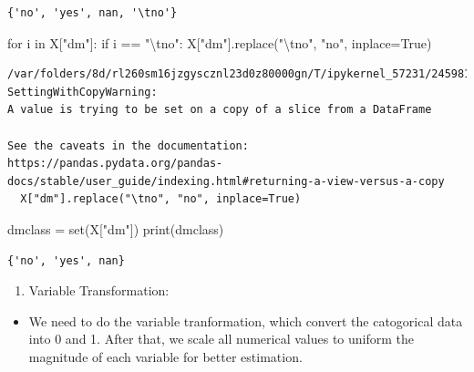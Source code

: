 \documentclass[
  11pt,
  letterpaper,
  DIV=11,
  numbers=noendperiod]{scrartcl}
\newenvironment{Shaded}{\begin{snugshade}}{\end{snugshade}}
\newcommand{\BuiltInTok}[1]{\textcolor[rgb]{0.00,0.23,0.31}{#1}}
\newcommand{\CharTok}[1]{\textcolor[rgb]{0.13,0.47,0.30}{#1}}
\newcommand{\ControlFlowTok}[1]{\textcolor[rgb]{0.00,0.23,0.31}{#1}}
\newcommand{\KeywordTok}[1]{\textcolor[rgb]{0.00,0.23,0.31}{#1}}
\newcommand{\NormalTok}[1]{\textcolor[rgb]{0.00,0.23,0.31}{#1}}
\newcommand{\OperatorTok}[1]{\textcolor[rgb]{0.37,0.37,0.37}{#1}}
\newcommand{\StringTok}[1]{\textcolor[rgb]{0.13,0.47,0.30}{#1}}
\newcommand{\VariableTok}[1]{\textcolor[rgb]{0.07,0.07,0.07}{#1}}
\providecommand{\tightlist}{%
  \setlength{\itemsep}{0pt}\setlength{\parskip}{0pt}}\usepackage{longtable,booktabs,array}
\begin{document}
\begin{verbatim}
{'no', 'yes', nan, '\tno'}
\end{verbatim}

\begin{Shaded}
\begin{Highlighting}[]
\ControlFlowTok{for}\NormalTok{ i }\KeywordTok{in}\NormalTok{ X[}\StringTok{"dm"}\NormalTok{]:}
    \ControlFlowTok{if}\NormalTok{ i }\OperatorTok{==} \StringTok{"}\CharTok{\textbackslash{}t}\StringTok{no"}\NormalTok{:}
\NormalTok{        X[}\StringTok{"dm"}\NormalTok{].replace(}\StringTok{"}\CharTok{\textbackslash{}t}\StringTok{no"}\NormalTok{, }\StringTok{"no"}\NormalTok{, inplace}\OperatorTok{=}\VariableTok{True}\NormalTok{)}
\end{Highlighting}
\end{Shaded}

\begin{verbatim}
/var/folders/8d/rl260sm16jzgyscznl23d0z80000gn/T/ipykernel_57231/2459818985.py:3: SettingWithCopyWarning: 
A value is trying to be set on a copy of a slice from a DataFrame

See the caveats in the documentation: https://pandas.pydata.org/pandas-docs/stable/user_guide/indexing.html#returning-a-view-versus-a-copy
  X["dm"].replace("\tno", "no", inplace=True)
\end{verbatim}

\begin{Shaded}
\begin{Highlighting}[]
\NormalTok{dmclass }\OperatorTok{=} \BuiltInTok{set}\NormalTok{(X[}\StringTok{"dm"}\NormalTok{])}
\BuiltInTok{print}\NormalTok{(dmclass)}
\end{Highlighting}
\end{Shaded}

\begin{verbatim}
{'no', 'yes', nan}
\end{verbatim}

\begin{enumerate}
\def\labelenumi{\arabic{enumi}.}
\setcounter{enumi}{1}
\tightlist
\item
  Variable Transformation:
\end{enumerate}

\begin{itemize}
\tightlist
\item
  We need to do the variable tranformation, which convert the
  catogorical data into 0 and 1. After that, we scale all numerical
  values to uniform the magnitude of each variable for better
  estimation.
\end{itemize}
\end{document}
